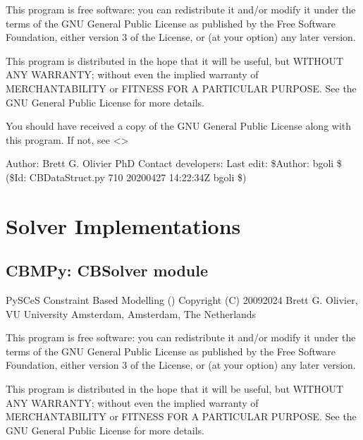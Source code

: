\documentclass[letterpaper,12pt,english]{sphinxmanual}
\begin{document}
\sphinxAtStartPar
This program is free software: you can redistribute it and/or modify
it under the terms of the GNU General Public License as published by
the Free Software Foundation, either version 3 of the License, or
(at your option) any later version.

\sphinxAtStartPar
This program is distributed in the hope that it will be useful,
but WITHOUT ANY WARRANTY; without even the implied warranty of
MERCHANTABILITY or FITNESS FOR A PARTICULAR PURPOSE.  See the
GNU General Public License for more details.

\sphinxAtStartPar
You should have received a copy of the GNU General Public License
along with this program.  If not, see \textless{}\textgreater{}

\sphinxAtStartPar
Author: Brett G. Olivier PhD
Contact developers: 
Last edit: \$Author: bgoli \$ (\$Id: CBDataStruct.py 710 2020\sphinxhyphen{}04\sphinxhyphen{}27 14:22:34Z bgoli \$)

\sphinxstepscope


\section{Solver Implementations}
\label{\detokenize{api/solvers:solver-implementations}}\label{\detokenize{api/solvers::doc}}

\subsection{CBMPy: CBSolver module}
\label{\detokenize{api/solvers:cbmpy-cbsolver-module}}\label{\detokenize{api/solvers:module-cbmpy.CBSolver}}
\sphinxAtStartPar
PySCeS Constraint Based Modelling ()
Copyright (C) 2009\sphinxhyphen{}2024 Brett G. Olivier, VU University Amsterdam, Amsterdam, The Netherlands

\sphinxAtStartPar
This program is free software: you can redistribute it and/or modify
it under the terms of the GNU General Public License as published by
the Free Software Foundation, either version 3 of the License, or
(at your option) any later version.

\sphinxAtStartPar
This program is distributed in the hope that it will be useful,
but WITHOUT ANY WARRANTY; without even the implied warranty of
MERCHANTABILITY or FITNESS FOR A PARTICULAR PURPOSE.  See the
GNU General Public License for more details.
\end{document}
